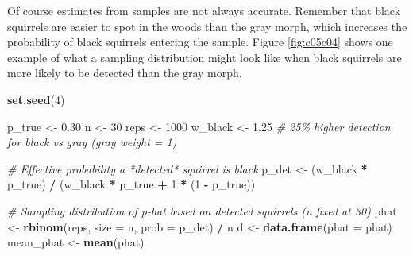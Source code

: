 \documentclass[
]{book}
\newenvironment{Shaded}{\begin{snugshade}}{\end{snugshade}}
\newcommand{\AttributeTok}[1]{\textcolor[rgb]{0.13,0.29,0.53}{#1}}
\newcommand{\CommentTok}[1]{\textcolor[rgb]{0.56,0.35,0.01}{\textit{#1}}}
\newcommand{\DecValTok}[1]{\textcolor[rgb]{0.00,0.00,0.81}{#1}}
\newcommand{\FloatTok}[1]{\textcolor[rgb]{0.00,0.00,0.81}{#1}}
\newcommand{\FunctionTok}[1]{\textcolor[rgb]{0.13,0.29,0.53}{\textbf{#1}}}
\newcommand{\NormalTok}[1]{#1}
\newcommand{\OtherTok}[1]{\textcolor[rgb]{0.56,0.35,0.01}{#1}}
\newcommand{\SpecialCharTok}[1]{\textcolor[rgb]{0.81,0.36,0.00}{\textbf{#1}}}
\begin{document}
Of course estimates from samples are not always accurate. Remember that black squirrels are easier to spot in the woods than the gray morph, which increases the probability of black squirrels entering the sample. Figure \ref{fig:c05c04} shows one example of what a sampling distribution might look like when black squirrels are more likely to be detected than the gray morph.

\begin{Shaded}
\begin{Highlighting}[]
\FunctionTok{set.seed}\NormalTok{(}\DecValTok{4}\NormalTok{)}

\NormalTok{p\_true }\OtherTok{\textless{}{-}} \FloatTok{0.30}
\NormalTok{n }\OtherTok{\textless{}{-}} \DecValTok{30}
\NormalTok{reps }\OtherTok{\textless{}{-}} \DecValTok{1000}
\NormalTok{w\_black }\OtherTok{\textless{}{-}} \FloatTok{1.25}  \CommentTok{\# 25\% higher detection for black vs gray (gray weight = 1)}

\CommentTok{\# Effective probability a *detected* squirrel is black}
\NormalTok{p\_det }\OtherTok{\textless{}{-}}\NormalTok{ (w\_black }\SpecialCharTok{*}\NormalTok{ p\_true) }\SpecialCharTok{/}\NormalTok{ (w\_black }\SpecialCharTok{*}\NormalTok{ p\_true }\SpecialCharTok{+} \DecValTok{1} \SpecialCharTok{*}\NormalTok{ (}\DecValTok{1} \SpecialCharTok{{-}}\NormalTok{ p\_true))}

\CommentTok{\# Sampling distribution of p{-}hat based on detected squirrels (n fixed at 30)}
\NormalTok{phat }\OtherTok{\textless{}{-}} \FunctionTok{rbinom}\NormalTok{(reps, }\AttributeTok{size =}\NormalTok{ n, }\AttributeTok{prob =}\NormalTok{ p\_det) }\SpecialCharTok{/}\NormalTok{ n}
\NormalTok{d }\OtherTok{\textless{}{-}} \FunctionTok{data.frame}\NormalTok{(}\AttributeTok{phat =}\NormalTok{ phat)}
\NormalTok{mean\_phat }\OtherTok{\textless{}{-}} \FunctionTok{mean}\NormalTok{(phat)}


\end{Highlighting}
\end{Shaded}
\end{document}
